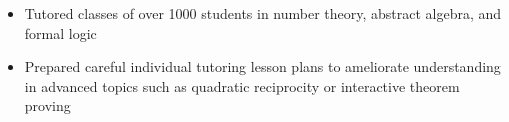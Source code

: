 \documentclass[10pt,a4paper]{altacv}
\newenvironment{tightitemize} %
{\vspace{-\topsep}\begin{itemize}\itemsep1pt \parskip0pt \parsep0pt}
{\end{itemize}\vspace{-\topsep}}
\begin{document}
\smallskip
\divider
\smallskip

\vspace{\topsep} %
\begin{tightitemize}
\item Tutored classes of over 1000 students in number theory, abstract algebra, 
    and formal logic
\item Prepared careful individual tutoring lesson plans to ameliorate 
    understanding in advanced topics such as quadratic reciprocity or 
    interactive theorem proving
\end{tightitemize}






\end{document}
